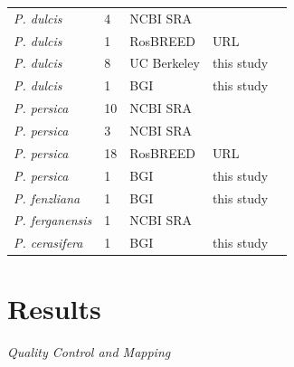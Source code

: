 \documentclass[12pt]{article}
\begin{document}
\begin{center}
\begin{longtable}{lllll}
                  \emph{P. dulcis} &4 &NCBI SRA &\citealt{koepke2013comparative}\\
                  \emph{P. dulcis} &1 &RosBREED &URL\\
                  \emph{P. dulcis} &8 &UC Berkeley &this study \\
                  \emph{P. dulcis} &1 &BGI &this study\\
                  \emph{P. persica} &10 &NCBI SRA &\citealt{verde2013high} \\ %
                  \emph{P. persica} &3 &NCBI SRA &\citealt{ahmad2011whole} \\ %
                  \emph{P. persica} &18 &RosBREED &URL \\ %
                  \emph{P. persica} &1 &BGI &this study \\ %
                 \emph{P. fenzliana} &1 &BGI &this study\\
                 \emph{P. ferganensis} &1 &NCBI SRA &\citealt{verde2013high}\\
                 \emph{P. cerasifera} &1 &BGI &this study\\ \hline

\end{longtable}
\end{center}



\section*{Results}
\emph{Quality Control and Mapping}\\
\end{document}
